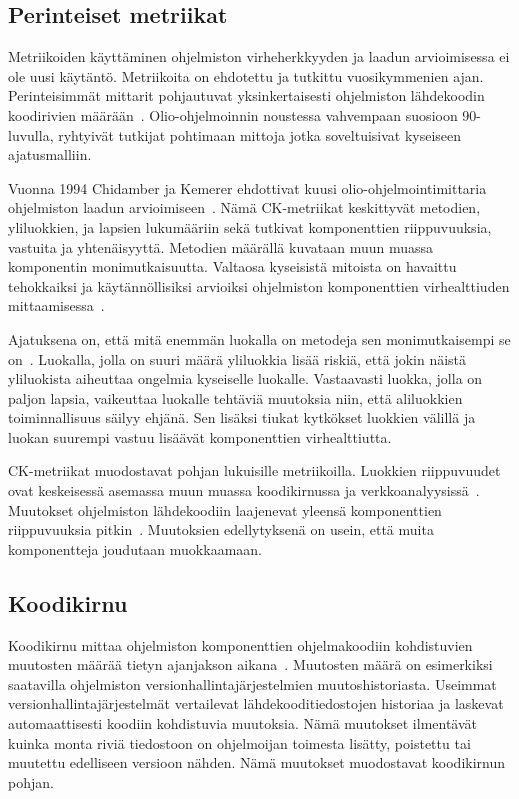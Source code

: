 \documentclass[finnish]{../tktltiki2}
\theoremstyle{definition}
\theoremstyle{remark}
\begin{document}
\subsection{Perinteiset metriikat}

Metriikoiden käyttäminen ohjelmiston virheherkkyyden ja laadun arvioimisessa ei ole uusi käytäntö. Metriikoita on 
ehdotettu ja tutkittu vuosikymmenien ajan. Perinteisimmät mittarit pohjautuvat yksinkertaisesti ohjelmiston lähdekoodin 
koodirivien määrään~\cite{BBM96}. Olio-ohjelmoinnin noustessa vahvempaan suosioon 90-luvulla, ryhtyivät tutkijat 
pohtimaan mittoja jotka soveltuisivat kyseiseen ajatusmalliin.

    Vuonna 1994 Chidamber ja Kemerer ehdottivat kuusi olio-ohjelmointimit\-taria ohjelmiston laadun 
arvioimiseen~\cite{CK94}. Nämä CK-metriikat keskittyvät metodien, yliluokkien, ja lapsien lukumääriin sekä tutkivat 
komponenttien riippuvuuksia, vastuita ja yhtenäisyyttä. Metodien määrällä kuvataan muun muassa komponentin 
monimutkaisuutta. Valtaosa kyseisistä mitoista on havaittu tehokkaiksi ja käytännöllisiksi arvioiksi ohjelmiston 
komponenttien virhealttiuden mittaamisessa~\cite{BBM96}.

    Ajatuksena on, että mitä enemmän luokalla on metodeja sen monimutkaisempi se on~\cite{BBM96}. Luokalla, jolla on 
suuri määrä yliluokkia lisää riskiä, että jokin näistä yliluokista aiheuttaa ongelmia kyseiselle luokalle. Vastaavasti 
luokka, jolla on paljon lapsia, vaikeuttaa luokalle tehtäviä muutoksia niin, että aliluokkien toiminnallisuus säilyy 
ehjänä. Sen lisäksi tiukat kytkökset luokkien välillä ja luokan suurempi vastuu lisäävät komponenttien virhealttiutta.

    CK-metriikat muodostavat pohjan lukuisille metriikoilla. Luokkien riippuvuudet ovat keskeisessä asemassa muun muassa 
koodikirnussa ja verkkoanalyysissä~\cite{NB05, NB07, ZN08}. Muutokset ohjelmiston lähdekoodiin laajenevat yleensä 
komponenttien riippuvuuksia pitkin~\cite{NB05, NB07}. Muutoksien edellytyksenä on usein, että muita komponentteja 
joudutaan muokkaamaan.

\subsection{Koodikirnu}

Koodikirnu mittaa ohjelmiston komponenttien ohjelmakoodiin kohdistuvien muutosten määrää tietyn ajanjakson 
aikana~\cite{NB05}. Muutosten määrä on esimerkiksi saatavilla ohjelmiston versionhallintajärjestelmien 
muutoshistoriasta. Useimmat versionhallintajärjestelmät vertailevat lähdekooditiedos\-tojen historiaa ja laskevat 
automaattisesti koodiin kohdistuvia muutoksia. Nämä muutokset ilmentävät kuinka monta riviä tiedostoon on ohjelmoijan 
toimesta lisätty, poistettu tai muutettu edelliseen versioon nähden. Nämä muutokset muodostavat koodikirnun pohjan.
\end{document}
